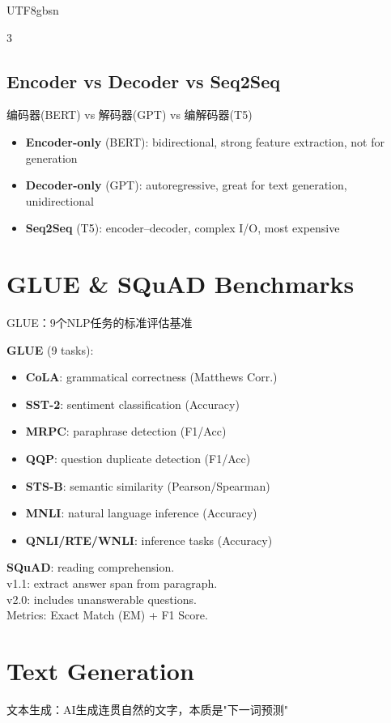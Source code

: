 \documentclass[9pt,landscape,a4paper]{article}
\newcommand{\zhint}[1]{{\scriptsize\color{gray!70!black}#1}}
\begin{document}
\begin{CJK}{UTF8}{gbsn}
\begin{multicols}{3}
\subsection{Encoder vs Decoder vs Seq2Seq}
\zhint{编码器(BERT) vs 解码器(GPT) vs 编解码器(T5)}
\begin{itemize}[leftmargin=8pt,itemsep=0pt,topsep=0pt]
\item \textbf{Encoder-only} (BERT): bidirectional, strong feature extraction, not for generation
\item \textbf{Decoder-only} (GPT): autoregressive, great for text generation, unidirectional
\item \textbf{Seq2Seq} (T5): encoder--decoder, complex I/O, most expensive
\end{itemize}

\section{GLUE \& SQuAD Benchmarks}
\zhint{GLUE：9个NLP任务的标准评估基准}

\textbf{GLUE} (9 tasks):
\begin{itemize}[leftmargin=8pt,itemsep=0pt,topsep=0pt]
\item \textbf{CoLA}: grammatical correctness (Matthews Corr.)
\item \textbf{SST-2}: sentiment classification (Accuracy)
\item \textbf{MRPC}: paraphrase detection (F1/Acc)
\item \textbf{QQP}: question duplicate detection (F1/Acc)
\item \textbf{STS-B}: semantic similarity (Pearson/Spearman)
\item \textbf{MNLI}: natural language inference (Accuracy)
\item \textbf{QNLI/RTE/WNLI}: inference tasks (Accuracy)
\end{itemize}

\textbf{SQuAD}: reading comprehension.\\
v1.1: extract answer span from paragraph.\\
v2.0: includes unanswerable questions.\\
Metrics: Exact Match (EM) + F1 Score.

\section{Text Generation}
\zhint{文本生成：AI生成连贯自然的文字，本质是"下一词预测"}


\end{multicols}
\end{CJK}
\end{document}
